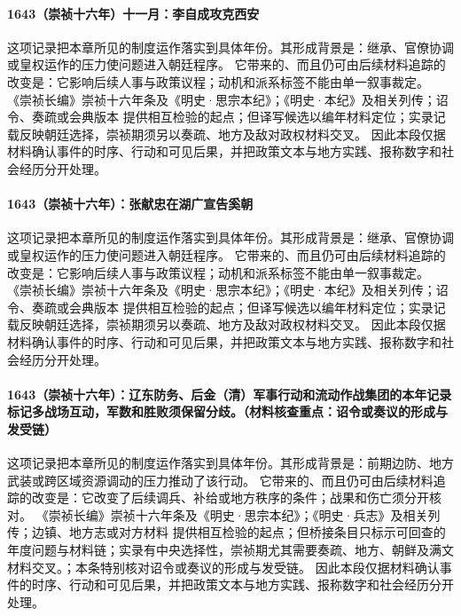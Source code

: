 \paragraph{1643（崇祯十六年）十一月：李自成攻克西安} 这项记录把本章所见的制度运作落实到具体年份。其形成背景是：继承、官僚协调或皇权运作的压力使问题进入朝廷程序。 它带来的、而且仍可由后续材料追踪的改变是：它影响后续人事与政策议程；动机和派系标签不能由单一叙事裁定。 《崇祯长编》崇祯十六年条及《明史·思宗本纪》；《明史·本纪》及相关列传；诏令、奏疏或会典版本 提供相互检验的起点；但译写候选以编年材料定位；实录记载反映朝廷选择，崇祯期须另以奏疏、地方及敌对政权材料交叉。 因此本段仅据材料确认事件的时序、行动和可见后果，并把政策文本与地方实践、报称数字和社会经历分开处理。

\paragraph{1643（崇祯十六年）：张献忠在湖广宣告奚朝} 这项记录把本章所见的制度运作落实到具体年份。其形成背景是：继承、官僚协调或皇权运作的压力使问题进入朝廷程序。 它带来的、而且仍可由后续材料追踪的改变是：它影响后续人事与政策议程；动机和派系标签不能由单一叙事裁定。 《崇祯长编》崇祯十六年条及《明史·思宗本纪》；《明史·本纪》及相关列传；诏令、奏疏或会典版本 提供相互检验的起点；但译写候选以编年材料定位；实录记载反映朝廷选择，崇祯期须另以奏疏、地方及敌对政权材料交叉。 因此本段仅据材料确认事件的时序、行动和可见后果，并把政策文本与地方实践、报称数字和社会经历分开处理。

\paragraph{1643（崇祯十六年）：辽东防务、后金（清）军事行动和流动作战集团的本年记录标记多战场互动，军数和胜败须保留分歧。（材料核查重点：诏令或奏议的形成与发受链）} 这项记录把本章所见的制度运作落实到具体年份。其形成背景是：前期边防、地方武装或跨区域资源调动的压力推动了该行动。 它带来的、而且仍可由后续材料追踪的改变是：它改变了后续调兵、补给或地方秩序的条件；战果和伤亡须分开核对。 《崇祯长编》崇祯十六年条及《明史·思宗本纪》；《明史·兵志》及相关列传；边镇、地方志或对方材料 提供相互检验的起点；但桥接条目只标示可回查的年度问题与材料链；实录有中央选择性，崇祯期尤其需要奏疏、地方、朝鲜及满文材料交叉。；本条特别核对诏令或奏议的形成与发受链。 因此本段仅据材料确认事件的时序、行动和可见后果，并把政策文本与地方实践、报称数字和社会经历分开处理。

